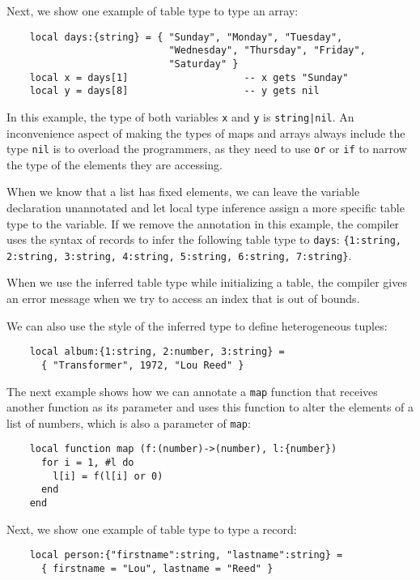 Next, we show one example of table type to type an array:
\begin{verbatim}
    local days:{string} = { "Sunday", "Monday", "Tuesday",
                            "Wednesday", "Thursday", "Friday",
                            "Saturday" }
    local x = days[1]                    -- x gets "Sunday"
    local y = days[8]                    -- y gets nil
\end{verbatim}

In this example, the type of both variables \texttt{x} and \texttt{y}
is \texttt{string|nil}.
An inconvenience aspect of making the types of maps and arrays always
include the type \texttt{nil} is to overload the programmers,
as they need to use \texttt{or} or \texttt{if} to narrow the type of
the elements they are accessing. 

When we know that a list has fixed elements, we can leave the
variable declaration unannotated and let local type inference assign
a more specific table type to the variable.
If we remove the annotation in this example, the compiler uses the
syntax of records to infer the following table type to \texttt{days}:
\texttt{\{1:string, 2:string, 3:string, 4:string, 5:string, 6:string, 7:string\}}.

When we use the inferred table type while initializing a table, the
compiler gives an error message when we try to access an index that
is out of bounds.

We can also use the style of the inferred type to define heterogeneous
tuples:
\begin{verbatim}
    local album:{1:string, 2:number, 3:string} =
      { "Transformer", 1972, "Lou Reed" }
\end{verbatim}

The next example shows how we can annotate a \texttt{map} function
that receives another function as its parameter and uses this
function to alter the elements of a list of numbers, which is
also a parameter of \texttt{map}:
\begin{verbatim}
    local function map (f:(number)->(number), l:{number})
      for i = 1, #l do
        l[i] = f(l[i] or 0)
      end
    end
\end{verbatim}

Next, we show one example of table type to type a record:
\begin{verbatim}
    local person:{"firstname":string, "lastname":string} =
      { firstname = "Lou", lastname = "Reed" } 
\end{verbatim}

